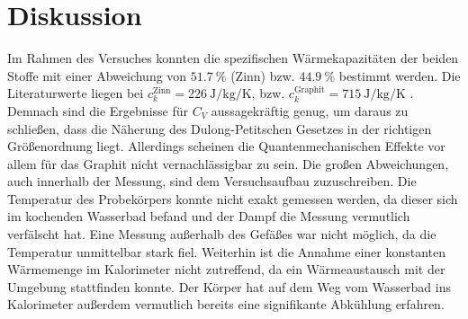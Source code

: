 \section{Diskussion}
\label{sec:Diskussion}

Im Rahmen des Versuches konnten die spezifischen Wärmekapazitäten der beiden Stoffe mit einer Abweichung von $\SI{51.7}{\%}$ (Zinn) bzw. $\SI{44.9}{\%}$ bestimmt werden. Die Literaturwerte liegen bei $c_k^\text{Zinn} = \SI{226}{\joule\per\kilogram\per\kelvin}$, bzw. $c_k^\text{Graphit} = \SI{715}{\joule\per\kilogram\per\kelvin}$ \cite{wärmeatlas}. Demnach sind die Ergebnisse für $C_V$ aussagekräftig genug, um daraus zu schließen, dass die Näherung des Dulong-Petitschen Gesetzes in der richtigen Größenordnung liegt. Allerdings scheinen die Quantenmechanischen Effekte vor allem für das Graphit nicht vernachlässigbar zu sein. Die großen Abweichungen, auch innerhalb der Messung, sind dem Versuchsaufbau zuzuschreiben. Die Temperatur des Probekörpers konnte nicht exakt gemessen werden, da dieser sich im kochenden Wasserbad befand und der Dampf die Messung vermutlich verfälscht hat. Eine Messung außerhalb des Gefäßes war nicht möglich, da die Temperatur unmittelbar stark fiel. Weiterhin ist die Annahme einer konstanten Wärmemenge im Kalorimeter nicht zutreffend, da ein Wärmeaustausch mit der Umgebung stattfinden konnte. Der Körper hat auf dem Weg vom Wasserbad ins Kalorimeter außerdem vermutlich bereits eine signifikante Abkühlung erfahren. 
